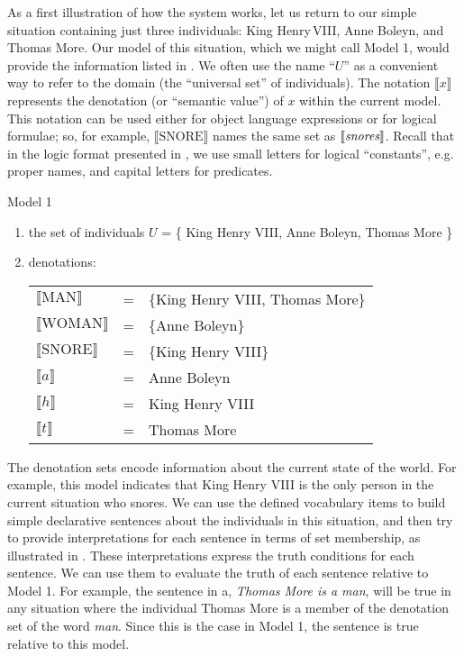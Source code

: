 As a first illustration of how the system works, let us return to our simple situation containing just three individuals: King Henry\,VIII, Anne Boleyn, and Thomas More. Our model of this situation, which we might call Model 1, would provide the information listed in . We often use the name “$U$” as a convenient way to refer to the domain (the “universal set” of individuals). The notation $\llbracket x\rrbracket$  represents the denotation (or “semantic value”) of $x$ within the current model. This notation can be used either for object language expressions or for logical formulae; so, for example, $\llbracket\text{SNORE}\rrbracket$  names the same set as $\llbracket\text{\itshape snores}\rrbracket$. Recall that in the logic format presented in , we use small letters for logical “constants”, e.g. proper names, and capital letters for predicates.

\newpage 
\ea \label{ex:13.20}Model 1\\
\begin{enumerate}[label=\roman*.]
\item the set of individuals $U$ = \{ King Henry VIII, Anne Boleyn, Thomas More \}
\item denotations:\smallskip\\
\begin{tabular}{@{}l@{~}c@{~}l@{}}
$\llbracket\text{MAN}\rrbracket$   & = & \{King Henry VIII, Thomas More\}\\
$\llbracket\text{WOMAN}\rrbracket$ & = & \{Anne Boleyn\}\\
$\llbracket\text{SNORE}\rrbracket$ & = & \{King Henry VIII\}\\
$\llbracket a\rrbracket$           & = & Anne Boleyn\\
$\llbracket h\rrbracket$           & = & King Henry VIII\\
$\llbracket t\rrbracket$           & = & Thomas More
\end{tabular}
\end{enumerate}
\z

The denotation sets encode information about the current state of the world. For example, this model indicates that King Henry VIII is the only person in the current situation who snores. We can use the defined vocabulary items to build simple declarative sentences about the individuals in this situation, and then try to provide interpretations for each sentence in terms of set membership, as illustrated in . These interpretations express the truth conditions for each sentence. We can use them to evaluate the truth of each sentence relative to Model 1. For example, the sentence in a, \textit{Thomas More is a man}, will be true in any situation where the individual Thomas More is a member of the denotation set of the word \textit{man}. Since this is the case in Model 1, the sentence is true relative to this model.



